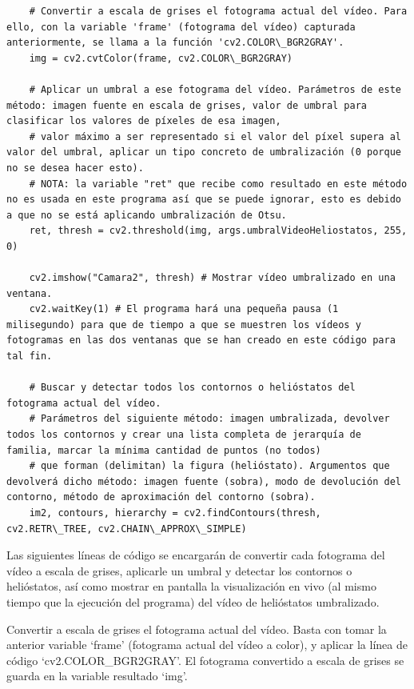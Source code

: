 \begin{lstlisting}
    # Convertir a escala de grises el fotograma actual del vídeo. Para ello, con la variable 'frame' (fotograma del vídeo) capturada anteriormente, se llama a la función 'cv2.COLOR\_BGR2GRAY'.
    img = cv2.cvtColor(frame, cv2.COLOR\_BGR2GRAY)
    
    # Aplicar un umbral a ese fotograma del vídeo. Parámetros de este método: imagen fuente en escala de grises, valor de umbral para clasificar los valores de píxeles de esa imagen,
    # valor máximo a ser representado si el valor del píxel supera al valor del umbral, aplicar un tipo concreto de umbralización (0 porque no se desea hacer esto).
    # NOTA: la variable "ret" que recibe como resultado en este método no es usada en este programa así que se puede ignorar, esto es debido a que no se está aplicando umbralización de Otsu.
    ret, thresh = cv2.threshold(img, args.umbralVideoHeliostatos, 255, 0)
    
    cv2.imshow("Camara2", thresh) # Mostrar vídeo umbralizado en una ventana.
    cv2.waitKey(1) # El programa hará una pequeña pausa (1 milisegundo) para que de tiempo a que se muestren los vídeos y fotogramas en las dos ventanas que se han creado en este código para tal fin.

    # Buscar y detectar todos los contornos o helióstatos del fotograma actual del vídeo.
    # Parámetros del siguiente método: imagen umbralizada, devolver todos los contornos y crear una lista completa de jerarquía de familia, marcar la mínima cantidad de puntos (no todos)
    # que forman (delimitan) la figura (helióstato). Argumentos que devolverá dicho método: imagen fuente (sobra), modo de devolución del contorno, método de aproximación del contorno (sobra).
    im2, contours, hierarchy = cv2.findContours(thresh, cv2.RETR\_TREE, cv2.CHAIN\_APPROX\_SIMPLE)
\end{lstlisting}

Las siguientes líneas de código se encargarán de convertir cada fotograma del vídeo a escala de grises, aplicarle un umbral y detectar los contornos o helióstatos, así como mostrar en pantalla la visualización en vivo (al mismo tiempo que la ejecución del programa) del vídeo de helióstatos umbralizado.

Convertir a escala de grises el fotograma actual del vídeo. Basta con tomar la anterior variable ‘frame’ (fotograma actual del vídeo a color), y aplicar la línea de código ‘cv2.COLOR\_BGR2GRAY’. El fotograma convertido a escala de grises se guarda en la variable resultado ‘img’.


